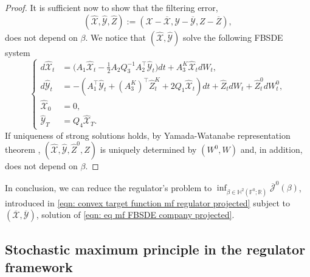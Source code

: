 \documentclass[11pt,twoside]{amsart}
\theoremstyle{definition}
\numberwithin{equation}{section}
\newcommand{\F}{\mathbb{F}}
\newcommand{\R}{\mathbb{R}}
\renewcommand{\bar}{\overline}
\renewcommand{\hat}{\widehat}
\begin{document}
\begin{proof}
It is sufficient now to show that the filtering error,
\begin{equation*}
(\hat{\mathcal{X}} , \hat{\mathcal{Y}}, \hat{Z}) := 
(\mathcal{X} - \bar{\mathcal{X}}, \mathcal{Y} - \bar{\mathcal{Y}}, Z - \bar{Z}),
\end{equation*}
does not depend on $\beta$. We notice that $(\hat{\mathcal{X}} , \hat{\mathcal{Y}})$ solve the following FBSDE system
\begin{equation*}
    \begin{cases}
d\hat{\mathcal{X}}_t&=   \big( A_1 \hat{\mathcal{X}}_t - \frac{1}{2}A_2Q_3^{-1}  A_2^\top\hat{\mathcal{Y}}_t\big) dt  + A^K_3\hat{\mathcal{X}}_tdW_t,\\
d\hat{\mathcal{Y}}_t &= - (A^\top_1 \hat{\mathcal{Y}}_t+ (A^K_3)^\top \hat{Z}^{K}_t+ 2Q_1 \hat{\mathcal{X}}_t )dt+ \hat{Z}_t dW_t+ \hat{Z}^0_t dW^0_t, \\
\hat{\mathcal{X}}_0 &= 0,\\
\hat{\mathcal{Y}}_T &= Q_4\hat{\mathcal{X}}_T.
    \end{cases}
\end{equation*}
If uniqueness of strong solutions holds, by Yamada-Watanabe representation theorem \cite[Theorem 1.33]{carmona2018probabilistic2}, $ (\hat{\mathcal{X}}, \hat{\mathcal{Y}}, \hat{Z}^0, \hat{Z})$ is uniquely determined by $(W^0,W)$ and, in addition, does not depend on $\beta$. 
\end{proof}
In conclusion, we can reduce the regulator's problem to $\inf_{\beta \in \mathbb{H}^2(\F^0; \R)}\bar{\mathcal{J}}^0(\beta)$, introduced in \eqref{eqn: convex target function mf regulator projected} subject to $(\bar{\mathcal{X}},\bar{\mathcal{Y}})$, solution of \eqref{eqn: eq mf FBSDE company projected}. 

\subsection{Stochastic maximum principle in the regulator framework}
\end{document}
